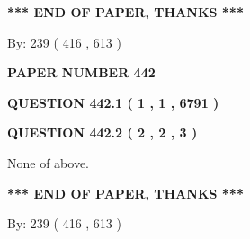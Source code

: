 \documentclass[12pt]{article}
\begin{document}
   
   
   
   
\vspace{1.0in} 
{\textbf{\large{ *** END OF PAPER, THANKS *** }}} 
   
   
\hspace{1.0in} By: 
 239 ( 416 ,  613 )
   
   
   
   
\newpage 
\setcounter{page}{ 
   442001 } 
   
   
   
   
 {\textbf{ \Large{ PAPER NUMBER  442  }}}
   
   
\vspace{0.2in}
   
   
   
   
   
   
 \vspace{0.2in}
 
 
 
 
   
   
  
\vspace{0.2in}
  
{\textbf{\Large{QUESTION
442.1 
 ( 1 , 1 , 6791 )
}}}
  
  
  
\vspace{0.2in}
  
{\textbf{\Large{QUESTION
442.2 
 ( 2 , 2 , 3 )
}}}
  
  
 
 
\noindent{}
 
 
 None of above.
 
 
 
 
   
   
 \vspace{0.2in}
 
   
   
   
   
\vspace{1.0in} 
{\textbf{\large{ *** END OF PAPER, THANKS *** }}} 
   
   
\hspace{1.0in} By: 
 239 ( 416 ,  613 )
   
   
   
   
\newpage 
\setcounter{page}{ 
   443001 } 
   
\end{document}
